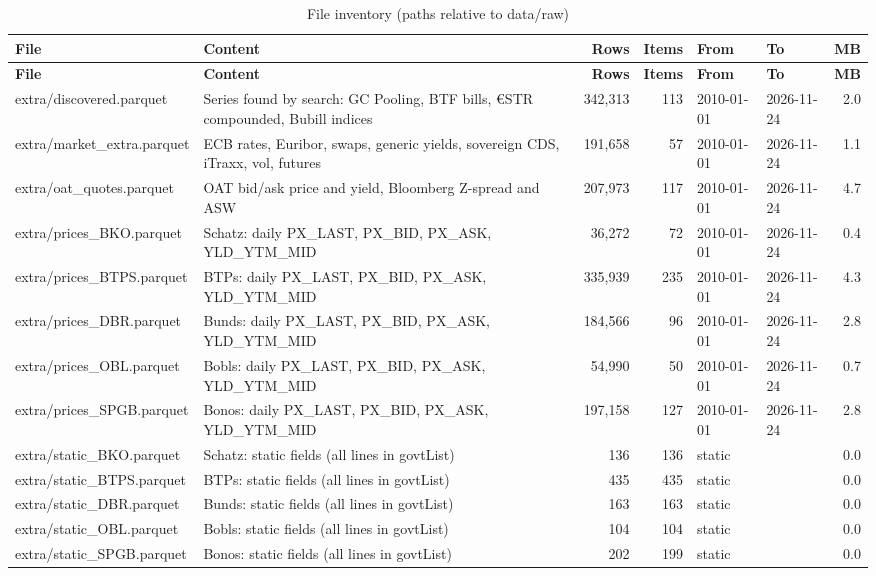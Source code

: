 \documentclass[10pt,a4paper]{article}
\begin{document}
{\footnotesize\begin{longtable}{llrrllr}
\caption{File inventory (paths relative to data/raw)}\\ \toprule \textbf{File} & \textbf{Content} & \textbf{Rows} & \textbf{Items} & \textbf{From} & \textbf{To} & \textbf{MB} \\ \midrule \endfirsthead
\toprule \textbf{File} & \textbf{Content} & \textbf{Rows} & \textbf{Items} & \textbf{From} & \textbf{To} & \textbf{MB} \\ \midrule \endhead
extra/discovered.parquet & Series found by search: GC Pooling, BTF bills, €STR compounded, Bubill indices & 342,313 & 113 & 2010-01-01 & 2026-11-24 & 2.0 \\
extra/market\_extra.parquet & ECB rates, Euribor, swaps, generic yields, sovereign CDS, iTraxx, vol, futures & 191,658 & 57 & 2010-01-01 & 2026-11-24 & 1.1 \\
extra/oat\_quotes.parquet & OAT bid/ask price and yield, Bloomberg Z-spread and ASW & 207,973 & 117 & 2010-01-01 & 2026-11-24 & 4.7 \\
extra/prices\_BKO.parquet & Schatz: daily PX\_LAST, PX\_BID, PX\_ASK, YLD\_YTM\_MID & 36,272 & 72 & 2010-01-01 & 2026-11-24 & 0.4 \\
extra/prices\_BTPS.parquet & BTPs: daily PX\_LAST, PX\_BID, PX\_ASK, YLD\_YTM\_MID & 335,939 & 235 & 2010-01-01 & 2026-11-24 & 4.3 \\
extra/prices\_DBR.parquet & Bunds: daily PX\_LAST, PX\_BID, PX\_ASK, YLD\_YTM\_MID & 184,566 & 96 & 2010-01-01 & 2026-11-24 & 2.8 \\
extra/prices\_OBL.parquet & Bobls: daily PX\_LAST, PX\_BID, PX\_ASK, YLD\_YTM\_MID & 54,990 & 50 & 2010-01-01 & 2026-11-24 & 0.7 \\
extra/prices\_SPGB.parquet & Bonos: daily PX\_LAST, PX\_BID, PX\_ASK, YLD\_YTM\_MID & 197,158 & 127 & 2010-01-01 & 2026-11-24 & 2.8 \\
extra/static\_BKO.parquet & Schatz: static fields (all lines in govtList) & 136 & 136 & static &  & 0.0 \\
extra/static\_BTPS.parquet & BTPs: static fields (all lines in govtList) & 435 & 435 & static &  & 0.0 \\
extra/static\_DBR.parquet & Bunds: static fields (all lines in govtList) & 163 & 163 & static &  & 0.0 \\
extra/static\_OBL.parquet & Bobls: static fields (all lines in govtList) & 104 & 104 & static &  & 0.0 \\
extra/static\_SPGB.parquet & Bonos: static fields (all lines in govtList) & 202 & 199 & static &  & 0.0 \\

\end{longtable}}
\end{document}
